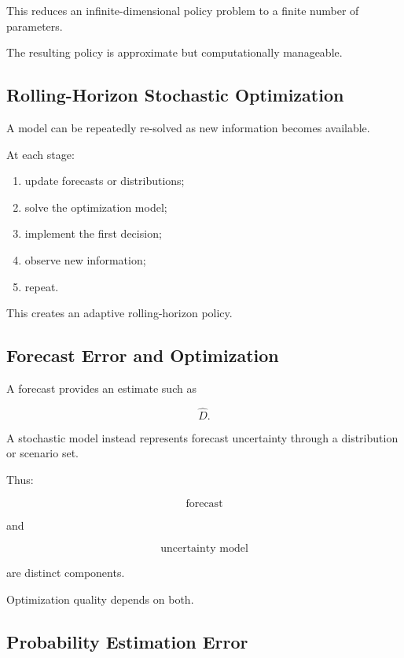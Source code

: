 This reduces an infinite-dimensional policy problem to a finite number of
parameters.

The resulting policy is approximate but computationally manageable.

\subsection{Rolling-Horizon Stochastic Optimization}
\label{subsec:rolling-horizon-stochastic}

A model can be repeatedly re-solved as new information becomes available.

At each stage:

\begin{enumerate}
    \item update forecasts or distributions;
    \item solve the optimization model;
    \item implement the first decision;
    \item observe new information;
    \item repeat.
\end{enumerate}

This creates an adaptive rolling-horizon policy.

\subsection{Forecast Error and Optimization}
\label{subsec:forecast-error-optimization}

A forecast provides an estimate such as

\[
\widehat{D}.
\]

A stochastic model instead represents forecast uncertainty through a
distribution or scenario set.

Thus:

\[
\boxed{
\text{forecast}
}
\]

and

\[
\boxed{
\text{uncertainty model}
}
\]

are distinct components.

Optimization quality depends on both.

\subsection{Probability Estimation Error}
\label{subsec:probability-estimation-error}

